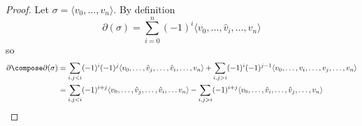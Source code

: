 \documentclass[a4paper]{article}
\renewcommand{\b}{\partial} %
\begin{document}
\begin{proof}
  Let \(\sigma = \langle v_0, \dots, v_n \rangle\). By definition
  \[
    \b(\sigma) = \sum_{i = 0}^n (-1)^i \langle v_0, \dots, \hat v_i, \dots, v_n \rangle
  \]
  so
  \begin{align*}
    \b \compose \b(\sigma)
    &= \sum_{i, j < i} (-1)^i (-1)^j \langle v_0, \dots, \hat v_j, \dots, \hat v_i, \dots, v_n \rangle
      + \sum_{i, j > i} (-1)^i (-1)^{j - 1} \langle v_0, \dots, v_i, \dots, v_j, \dots, v_n \rangle \\
    &= \sum_{i, j < i} (-1)^{i + j} \langle v_0, \dots, \hat v_j, \dots, \hat v_i, \dots v_n \rangle
      - \sum_{i, j > i} (-1)^{i + j} \langle v_0, \dots, \hat v_i, \dots, \hat v_j, \dots, v_n \rangle
  \end{align*}
\end{proof}




\printindex
\end{document}
